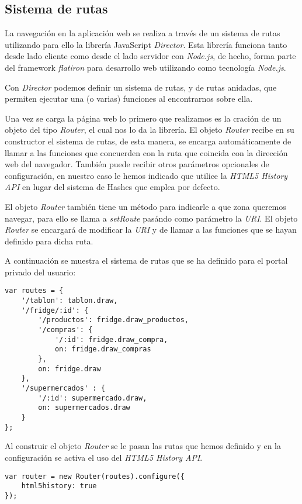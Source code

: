 \subsection{Sistema de rutas}

La navegación en la aplicación web se realiza a través de un sistema de rutas utilizando para ello la librería JavaScript \emph{Director}. Esta librería funciona tanto desde lado cliente como desde el lado servidor con \emph{Node.js}, de hecho, forma parte del framework \emph{flatiron} para desarrollo web utilizando como tecnología \emph{Node.js}.

Con \emph{Director} podemos definir un sistema de rutas, y de rutas anidadas, que permiten ejecutar una (o varias) funciones al encontrarnos sobre ella.

Una vez se carga la página web lo primero que realizamos es la cración de un objeto del tipo \emph{Router}, el cual nos lo da la librería. El objeto \emph{Router} recibe en su constructor el sistema de rutas, de esta manera, se encarga automáticamente de llamar a las funciones que concuerden con la ruta que coincida con la dirección web del navegador. También puede recibir otros parámetros opcionales de configuración, en nuestro caso le hemos indicado que utilice la \emph{HTML5 History API} en lugar del sistema de Hashes que emplea por defecto.

El objeto \emph{Router} también tiene un método para indicarle a que zona queremos navegar, para ello se llama a \emph{setRoute} pasándo como parámetro la \emph{URI}. El objeto \emph{Router} se encargará de modificar la \emph{URI} y de llamar a las funciones que se hayan definido para dicha ruta.

A continuación se muestra el sistema de rutas que se ha definido para el portal privado del usuario:

    \begin{lstlisting}
var routes = {
    '/tablon': tablon.draw,
    '/fridge/:id': {
        '/productos': fridge.draw_productos,
        '/compras': {
            '/:id': fridge.draw_compra,
            on: fridge.draw_compras
        },
        on: fridge.draw
    },
    '/supermercados' : {
        '/:id': supermercado.draw,
        on: supermercados.draw
    }
};
    \end{lstlisting}

Al construir el objeto \emph{Router} se le pasan las rutas que hemos definido y en la configuración se activa el uso del \emph{HTML5 History API}.

    \begin{lstlisting}
var router = new Router(routes).configure({
    html5history: true
});
    \end{lstlisting}

